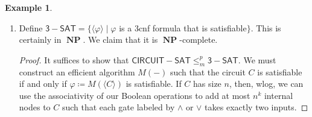 \documentclass[10pt,letterpaper,cm]{nupset}
\theoremstyle{definition}
\newtheorem{exmp}{Example}
\newcommand{\1}{\mathbf{1}}
\newcommand{\0}{\vec 0}
\DeclareMathOperator{\NP}{\mathbf{NP}}
\begin{document}
\begin{exmp} $ $
\begin{enumerate}
\item Define $\mathsf{3{-}SAT}= \{\langle \varphi \rangle \mid \varphi$ is a 3cnf formula that is satisfiable$\}$. This is certainly in $\NP$. We claim that it is $\NP$-complete.
\begin{proof}
It suffices to show that $\mathsf{CIRCUIT{-}SAT} \leq_m^p \mathsf{3{-}SAT}$. We must construct an efficient algorithm $M( -)$ such that the circuit $C$ is satisfiable  if and only if $\varphi\coloneqq M(\langle C \rangle)$ is satisfiable. If $C$ has size $n$, then, wlog, we can use the associativity of our Boolean operations to add at most $n^k$ internal nodes to $C$ such that each gate labeled by $\land$ or $\vee$ takes exactly two inputs. 


\end{proof}
\end{enumerate}
\end{exmp}
\end{document}
